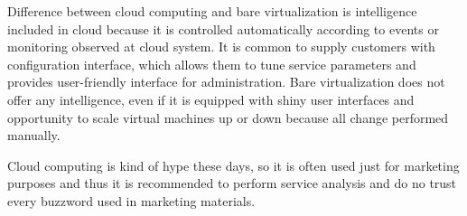 Difference between cloud computing and bare virtualization is intelligence included in cloud because it is controlled automatically according to events or monitoring observed at cloud system. It is common to supply customers with configuration interface, which allows them to tune service parameters and provides user-friendly interface for administration.
Bare virtualization does not offer any intelligence, even if it is equipped with shiny user interfaces and opportunity to scale virtual machines up or down because all change performed manually.

Cloud computing is kind of hype these days, so it is often used just for marketing purposes and thus it is recommended to perform service analysis and do no trust every buzzword used in marketing materials.
